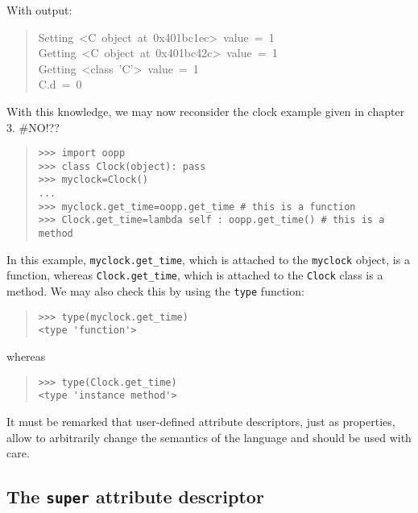 \documentclass[10pt,english]{article}
\begin{document}
With output:
\begin{quote}
\begin{ttfamily}\begin{flushleft}
\mbox{Setting~<C~object~at~0x401bc1ec>~value~=~1}\\
\mbox{Getting~<C~object~at~0x401bc42c>~value~=~1}\\
\mbox{Getting~<class~'C'>~value~=~1~~~~~~}\\
\mbox{C.d~=~0}
\end{flushleft}\end{ttfamily}
\end{quote}

With this knowledge, we may now reconsider the clock example given 
in chapter 3. {\#}NO!??
\begin{quote}
\begin{verbatim}>>> import oopp
>>> class Clock(object): pass
>>> myclock=Clock()
...
>>> myclock.get_time=oopp.get_time # this is a function
>>> Clock.get_time=lambda self : oopp.get_time() # this is a method \end{verbatim}
\end{quote}

In this example, \texttt{myclock.get{\_}time}, which is attached to the \texttt{myclock} 
object, is a function, whereas \texttt{Clock.get{\_}time}, which is attached to 
the \texttt{Clock} class is a method. We may also check this by using the \texttt{type} 
function:
\begin{quote}
\begin{verbatim}>>> type(myclock.get_time)
<type 'function'>\end{verbatim}
\end{quote}

whereas
\begin{quote}
\begin{verbatim}>>> type(Clock.get_time) 
<type 'instance method'>\end{verbatim}
\end{quote}

It must be remarked that user-defined attribute descriptors, just as
properties, allow to arbitrarily change the semantics of the language
and should be used with care.



\hypertarget{the-super-attribute-descriptor}{}
\subsection*{The \texttt{super} attribute descriptor}
\end{document}
